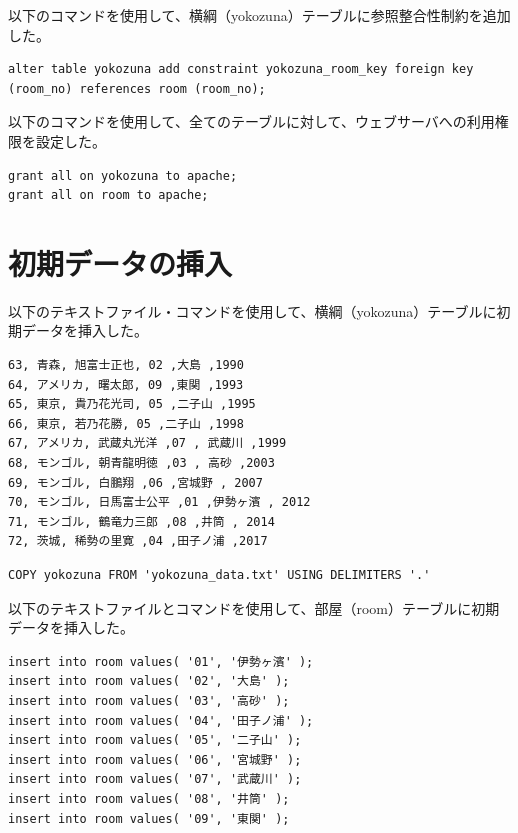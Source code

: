 \documentclass[10pt,a4paper,titlepage]{jreport}
\begin{document}
以下のコマンドを使用して、横綱（yokozuna）テーブルに参照整合性制約を追加した。

\begin{lstlisting}[caption=横綱テーブルへの参照整合性制約の設定のコマンド]
alter table yokozuna add constraint yokozuna_room_key foreign key (room_no) references room (room_no);
\end{lstlisting}
\vspace{3mm}

以下のコマンドを使用して、全てのテーブルに対して、ウェブサーバへの利用権限を設定した。

\begin{lstlisting}[caption=横綱・部屋テーブルへの利用権限の設定のコマンド]
grant all on yokozuna to apache;
grant all on room to apache;
\end{lstlisting}


\section{初期データの挿入}
以下のテキストファイル・コマンドを使用して、横綱（yokozuna）テーブルに初期データを挿入した。

\begin{lstlisting}[caption=横綱テーブルの初期データ（yokozuna\_data.txt\_list.php）]
63, 青森, 旭富士正也, 02 ,大島 ,1990
64, アメリカ, 曙太郎, 09 ,東関 ,1993
65, 東京, 貴乃花光司, 05 ,二子山 ,1995
66, 東京, 若乃花勝, 05 ,二子山 ,1998
67, アメリカ, 武蔵丸光洋 ,07 , 武蔵川 ,1999
68, モンゴル, 朝青龍明徳 ,03 , 高砂 ,2003
69, モンゴル, 白鵬翔 ,06 ,宮城野 , 2007
70, モンゴル, 日馬富士公平 ,01 ,伊勢ヶ濱 , 2012
71, モンゴル, 鶴竜力三郎 ,08 ,井筒 , 2014
72, 茨城, 稀勢の里寛 ,04 ,田子ノ浦 ,2017

\end{lstlisting}

\begin{lstlisting}[caption=横綱テーブルへの初期データの挿入]
	COPY yokozuna FROM 'yokozuna_data.txt' USING DELIMITERS '.'
\end{lstlisting}
\vspace{3mm}

以下のテキストファイルとコマンドを使用して、部屋（room）テーブルに初期データを挿入した。

\begin{lstlisting}[caption=部屋テーブルへの初期データの挿入（room\_data.txt）]
insert into room values( '01', '伊勢ヶ濱' );
insert into room values( '02', '大島' );
insert into room values( '03', '高砂' );
insert into room values( '04', '田子ノ浦' );
insert into room values( '05', '二子山' );
insert into room values( '06', '宮城野' );
insert into room values( '07', '武蔵川' );
insert into room values( '08', '井筒' );
insert into room values( '09', '東関' );
\end{lstlisting}
\end{document}
